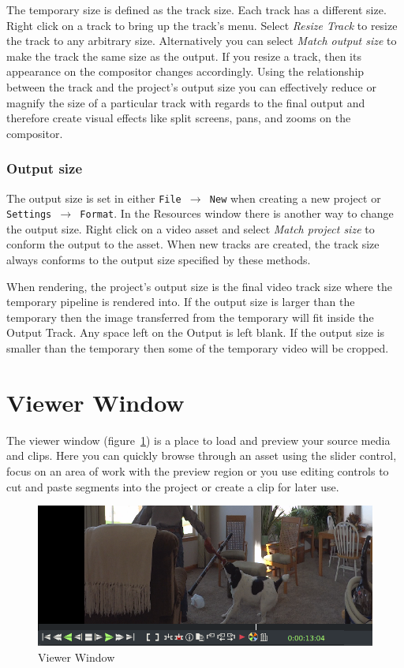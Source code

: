 The temporary size is defined as the track size. 
Each track has a different size. 
Right click on a track to bring up the track's menu. 
Select \emph{Resize Track} to resize the track to any arbitrary size. 
Alternatively you can select \emph{Match output size} to make the track the same size as the output. 
If you resize a track, then its appearance on the compositor changes accordingly. 
Using the relationship between the track and the project's output size you can effectively reduce or magnify the size of a particular track with regards to the final output and therefore create visual effects like split screens, pans, and zooms on the compositor.

\subsubsection*{Output size}%
\label{ssub:output_size}


The output size is set in either \texttt{File $\rightarrow$ New} when creating a new project or \texttt{Settings $\rightarrow$ Format}. 
In the Resources window there is another way to change the output size. 
Right click on a video asset and select \emph{Match project size} to conform the output to the asset. 
When new tracks are created, the track size always conforms to the output size specified by these methods.

When rendering, the project's output size is the final video track size where the temporary pipeline is rendered into.  
If the output size is larger than the temporary then the image transferred from the temporary will fit inside the Output Track. 
Any space left on the Output is left blank.  
If the output size is smaller than the temporary then some of the temporary video will be cropped.

\section{Viewer Window}%
\label{sec:viewer_window}

The viewer window (figure~\ref{fig:viewer_window}) is a place to load and preview your source media and clips.  
Here you can quickly browse through an asset using the slider control, focus on an area of work with the preview region or you use editing controls to cut and paste segments into the project or create a clip for later use.

\begin{figure}[htpb]
    \centering
    \includegraphics[width=0.99\linewidth]{images/viewer_window.png}
    \caption{Viewer Window}
    \label{fig:viewer_window}
\end{figure}

